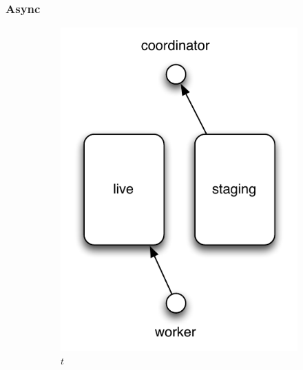 \documentclass[a4paper,11pt]{scrreprt}
\begin{document}
\subsubsection{Async}
\begin{figure}[h!]
\centering
	\begin{subfigure}[t]{2 in}
		\centering
		\includegraphics[scale=0.7]{async-mode1.pdf}
		\caption{\(t\)}\label{fig:asyncmode.t}		
	\end{subfigure}
	\begin{subfigure}[t]{2 in}
		\centering

\end{subfigure}
\end{figure}
\end{document}
